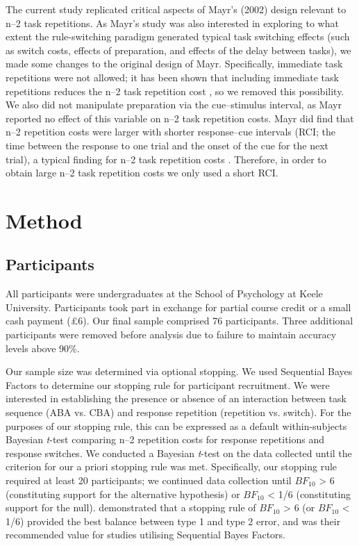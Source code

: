 \documentclass[a4paper, doc, natbib]{apa6}
\begin{document}
The current study replicated critical aspects of Mayr's (2002) design relevant to n--2 task repetitions. As Mayr's study was also interested in exploring to what extent the rule-switching paradigm generated typical task switching effects (such as switch costs, effects of preparation, and effects of the delay between tasks), we made some changes to the original design of Mayr. Specifically, immediate task repetitions were not allowed; it has been shown that including immediate task repetitions reduces the n--2 task repetition cost \citep{Philipp2006}, so we removed this possibility. We also did not manipulate preparation via the cue--stimulus interval, as Mayr reported no effect of this variable on n--2 task repetition costs. Mayr did find that n--2 repetition costs were larger with shorter response--cue intervals (RCI; the time between the response to one trial and the onset of the cue for the next trial), a typical finding for n--2 task repetition costs \citep{Gade2005, Grange2009, Mayr2000}. Therefore, in order to obtain large n--2 task repetition costs we only used a short RCI. 

\section{Method}

\subsection{Participants}
All participants were undergraduates at the School of Psychology at Keele University. Participants took part in exchange for partial course credit or a small cash payment (£6). Our final sample comprised 76 participants. Three additional participants were removed before analysis due to failure to maintain accuracy levels above 90\%.

Our sample size was determined via optional stopping. We used Sequential Bayes Factors \citep{Schoenbrodtinpress} to determine our stopping rule for participant recruitment. We were interested in establishing the presence or absence of an interaction between task sequence (ABA vs. CBA) and response repetition (repetition vs. switch). For the purposes of our stopping rule, this can be expressed as a default within-subjects Bayesian \emph{t}-test \citep{Rouder2009} comparing n--2 repetition costs for response repetitions and response switches.  We conducted a Bayesian \emph{t}-test on the data collected until the criterion for our a priori stopping rule was met. Specifically, our stopping rule required at least 20 participants; we continued data collection until $BF_{10}$ > 6 (constituting support for the alternative hypothesis) or $BF_{10}$ < 1/6 (constituting support for the null). \cite{Schoenbrodtinpress} demonstrated that a stopping rule of $BF_{10}$ > 6 (or $BF_{10}$ < 1/6) provided the best balance between type 1 and type 2 error, and was their recommended value for studies utilising Sequential Bayes Factors. 
\end{document}

